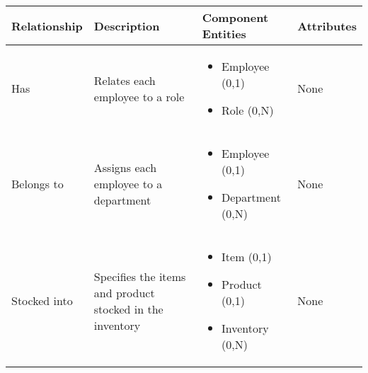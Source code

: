 \begin{longtable}{|p{}|p{} |p{}|p{} |} 
\hline
\textbf{Relationship} & \textbf{Description} & \textbf{Component Entities} & \textbf{Attributes} \\\hline


Has & Relates each employee to a role & \begin{itemize}
        \vspace{-1em}
        \item Employee (0,1)
        \item Role (0,N)
    \end{itemize}
 &  None \\\hline
 
Belongs to & Assigns each employee to a department & \begin{itemize}
        \vspace{-1em}
        \item Employee (0,1)
        \item Department (0,N)
    \end{itemize}
 &  None \\\hline

Stocked into & Specifies the items and product stocked in the inventory & \begin{itemize}
	\vspace{-1em}
	\item Item (0,1)
	\item Product (0,1)
	\item Inventory (0,N)
\end{itemize}
&  None \\\hline

\end{longtable}